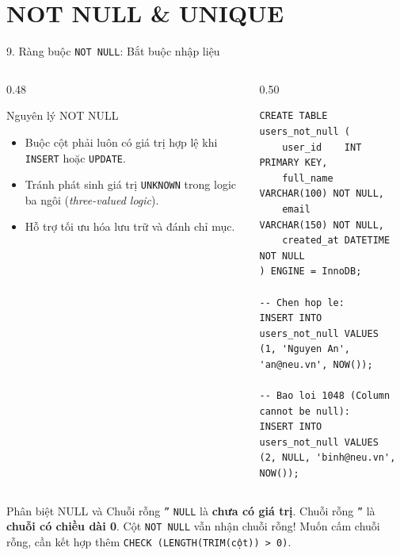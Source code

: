 \documentclass[aspectratio=169,11pt]{beamer}
\newcommand{\kw}[1]{\textcolor{dbblue}{\textbf{#1}}}
\begin{document}
\section{NOT NULL \& UNIQUE}
\begin{frame}[fragile]{9. Ràng buộc \texttt{NOT NULL}: Bắt buộc nhập liệu}
\begin{columns}[t]
  \begin{column}{0.48\textwidth}
    \begin{block}{Nguyên lý NOT NULL}
      \begin{itemize}\setlength{\itemsep}{1.5pt}
        \item Buộc cột phải luôn có giá trị hợp lệ khi \texttt{INSERT} hoặc \texttt{UPDATE}.
        \item Tránh phát sinh giá trị \texttt{UNKNOWN} trong logic ba ngôi (\textit{three-valued logic}).
        \item Hỗ trợ tối ưu hóa lưu trữ và đánh chỉ mục.
      \end{itemize}
    \end{block}
  \end{column}
  \begin{column}{0.50\textwidth}
\begin{lstlisting}
CREATE TABLE users_not_null (
    user_id    INT PRIMARY KEY,
    full_name  VARCHAR(100) NOT NULL,
    email      VARCHAR(150) NOT NULL,
    created_at DATETIME NOT NULL
) ENGINE = InnoDB;

-- Chen hop le:
INSERT INTO users_not_null VALUES 
(1, 'Nguyen An', 'an@neu.vn', NOW());

-- Bao loi 1048 (Column cannot be null):
INSERT INTO users_not_null VALUES 
(2, NULL, 'binh@neu.vn', NOW());
\end{lstlisting}
  \end{column}
\end{columns}

\begin{exampleblock}{Phân biệt NULL và Chuỗi rỗng \texttt{''}}
  \texttt{NULL} là \kw{chưa có giá trị}. Chuỗi rỗng \texttt{''} là \kw{chuỗi có chiều dài 0}. Cột \texttt{NOT NULL} vẫn nhận chuỗi rỗng! Muốn cấm chuỗi rỗng, cần kết hợp thêm \texttt{CHECK (LENGTH(TRIM(cột)) > 0)}.
\end{exampleblock}
\end{frame}
\end{document}

